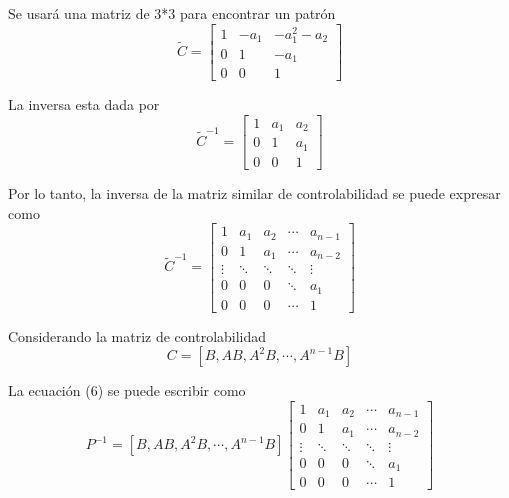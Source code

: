 Se usará una matriz de 3*3 para encontrar un patrón
\[
    \tilde{C} = 
    \begin{bmatrix}
        1 & -a_{1} & -a_{1}^{2}-a_{2} \\
        0 & 1 & -a_{1} \\
        0 & 0 & 1
    \end{bmatrix}
\]

La inversa esta dada por
\[
    \tilde{C}^{-1} = 
    \begin{bmatrix}
        1 & a_{1} & a_{2} \\
        0 & 1 & a_{1} \\
        0 & 0 & 1
    \end{bmatrix}
\]

Por lo tanto, la inversa de la matriz similar de controlabilidad se puede expresar como 
\[
    \tilde{C}^{-1} = 
    \begin{bmatrix}
        1 & a_{1} & a_{2} & \cdots & a_{n-1} \\
        0 & 1 & a_{1} & \cdots & a_{n-2}\\
        \vdots & \ddots & \ddots & \ddots & \vdots\\
        0 & 0 & 0 & \ddots & a_{1}\\
        0 & 0 & 0 & \cdots & 1
    \end{bmatrix}
\]

Considerando la matriz de controlabilidad 
\[
    C = [B, AB, A^{2}B, \cdots, A^{n-1}B ]
\]

La ecuación (6) se puede escribir como
\[
    P^{-1} =
    [B, AB, A^{2}B, \cdots, A^{n-1}B ]
    \begin{bmatrix}
        1 & a_{1} & a_{2} & \cdots & a_{n-1} \\
        0 & 1 & a_{1} & \cdots & a_{n-2}\\
        \vdots & \ddots & \ddots & \ddots & \vdots\\
        0 & 0 & 0 & \ddots & a_{1}\\
        0 & 0 & 0 & \cdots & 1
    \end{bmatrix}
\]